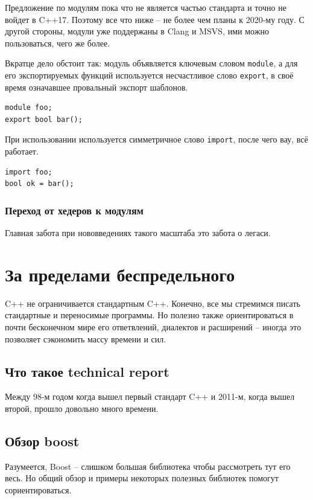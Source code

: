 \documentclass[a4paper,12pt,oneside]{article}
\begin{document}
Предложение по модулям пока что не является частью стандарта и точно не войдет в C++17. Поэтому все что ниже -- не более чем планы к 2020-му году. С другой стороны, модули уже поддержаны в Clang и MSVS, ими можно пользоваться, чего же более.

Вкратце дело обстоит так: модуль объявляется ключевым словом \lstinline!module!, а для его экспортируемых функций используется несчастливое слово \lstinline!export!, в своё время означавшее провальный экспорт шаблонов.

\begin{lstlisting}
module foo;
export bool bar(); 
\end{lstlisting}

При использовании используется симметричное слово \lstinline!import!, после чего вау, всё работает.

\begin{lstlisting}
import foo;
bool ok = bar(); 
\end{lstlisting}

\subsubsection{Переход от хедеров к модулям}

Главная забота при нововведениях такого масштаба это забота о легаси.

\pagebreak
\section{За пределами беспредельного}

C++ не ограничивается стандартным C++. Конечно, все мы стремимся писать стандартные и переносимые программы. Но полезно также ориентироваться в почти бесконечном мире его ответвлений, диалектов и расширений -- иногда это позволяет сэкономить массу времени и сил.

\subsection{Что такое technical report}

Между 98-м годом когда вышел первый стандарт C++ и 2011-м, когда вышел второй, прошло довольно много времени.

\subsection{Обзор boost}

Разумеется, Boost -- слишком большая библиотека чтобы рассмотреть тут его весь. Но общий обзор и примеры некоторых полезных библиотек помогут сориентироваться.
\end{document}

